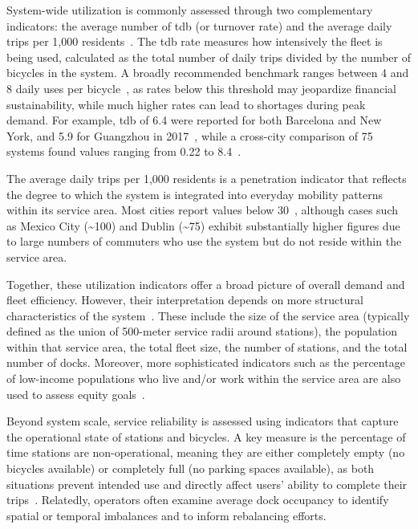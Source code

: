     System-wide utilization is commonly assessed through two complementary indicators: the average number of \ac{tdb} (or turnover rate) and the average daily trips per 1,000 residents~\cite{Waldner2025, Yanocha2018, Yahya2017}. The \ac{tdb} rate measures how intensively the fleet is being used, calculated as the total number of daily trips divided by the number of bicycles in the system. A broadly recommended benchmark ranges between 4 and 8 daily uses per bicycle~\cite{Yanocha2018}, as rates below this threshold may jeopardize financial sustainability, while much higher rates can lead to shortages during peak demand. For example, \ac{tdb} of 6.4 were reported for both Barcelona and New York, and 5.9 for Guangzhou in 2017~\cite{Yanocha2018}, while a cross-city comparison of 75 systems found values ranging from 0.22 to 8.4~\cite{deChardon2017}.

    The average daily trips per 1,000 residents is a penetration indicator that reflects the degree to which the system is integrated into everyday mobility patterns within its service area. Most cities report values below 30~\cite{Yanocha2018}, although cases such as Mexico City (\textasciitilde100) and Dublin (\textasciitilde75) exhibit substantially higher figures due to large numbers of commuters who use the system but do not reside within the service area.

    Together, these utilization indicators offer a broad picture of overall demand and fleet efficiency. However, their interpretation depends on more structural characteristics of the system~\cite{Yanocha2018}. These include the size of the service area (typically defined as the union of 500-meter service radii around stations), the population within that service area, the total fleet size, the number of stations, and the total number of docks. Moreover, more sophisticated indicators such as the percentage of low-income populations who live and/or work within the service area are also used to assess equity goals~\cite{Yanocha2018}.

    Beyond system scale, service reliability is assessed using indicators that capture the operational state of stations and bicycles. A key measure is the percentage of time stations are non-operational, meaning they are either completely empty (no bicycles available) or completely full (no parking spaces available), as both situations prevent intended use and directly affect users’ ability to complete their trips~\cite{Santander2022, Rossow2018}. Relatedly, operators often examine average dock occupancy to identify spatial or temporal imbalances and to inform rebalancing efforts.
    
